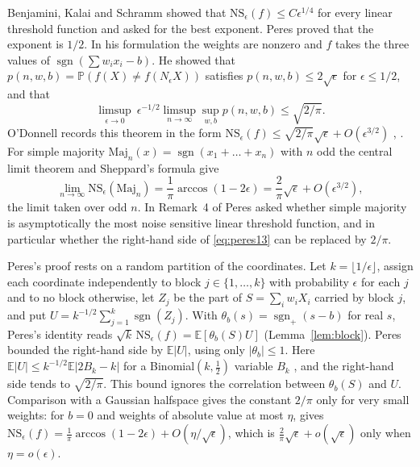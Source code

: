 \documentclass[11pt]{amsart}
\theoremstyle{remark}
\numberwithin{equation}{section}
\newcommand{\PP}{\mathbb{P}}
\newcommand{\EE}{\mathbb{E}}
\newcommand{\sgnp}{\operatorname{sgn}_+}
\newcommand{\sgnz}{\operatorname{sgn}}
\begin{document}
Benjamini, Kalai and Schramm \cite{BKS} showed that $\mathrm{NS}_\epsilon(f)\le C\epsilon^{1/4}$ for every linear threshold function and asked for the best exponent. Peres \cite{Per04} proved that the exponent is $1/2$. In his formulation the weights are nonzero and $f$ takes the three values of $\sgnz(\sum w_ix_i-b)$. He showed that $p(n,w,b)=\PP(f(X)\ne f(N_\epsilon X))$ satisfies $p(n,w,b)\le2\sqrt\epsilon$ for $\epsilon\le1/2$, and that
\begin{equation}\label{eq:peres13}
\limsup_{\epsilon\to0}\ \epsilon^{-1/2}\limsup_{n\to\infty}\sup_{w,b}p(n,w,b)\le\sqrt{2/\pi}.
\end{equation}
O'Donnell records this theorem in the form $\mathrm{NS}_\epsilon(f)\le\sqrt{2/\pi}\sqrt\epsilon+O(\epsilon^{3/2})$ \cite{OD12}, \cite[Remark~5.36]{OD14}.
For simple majority $\mathrm{Maj}_n(x)=\sgnz(x_1+\dots+x_n)$ with $n$ odd the central limit theorem and Sheppard's formula \cite{She99} give
\begin{equation}\label{eq:maj}
\lim_{n\to\infty}\mathrm{NS}_\epsilon(\mathrm{Maj}_n)=\frac1\pi\arccos(1-2\epsilon)=\frac2\pi\sqrt\epsilon+O(\epsilon^{3/2}),
\end{equation}
the limit taken over odd $n$. In Remark~4 of \cite{Per04} Peres asked whether simple majority is asymptotically the most noise sensitive linear threshold function, and in particular whether the right-hand side of \eqref{eq:peres13} can be replaced by $2/\pi$.

Peres's proof rests on a random partition of the coordinates. Let $k=\lfloor1/\epsilon\rfloor$, assign each coordinate independently to block $j\in\{1,\dots,k\}$ with probability $\epsilon$ for each $j$ and to no block otherwise, let $Z_j$ be the part of $S=\sum_iw_iX_i$ carried by block $j$, and put $U=k^{-1/2}\sum_{j=1}^k\sgnz(Z_j)$. With $\theta_b(s)=\sgnp(s-b)$ for real $s$, Peres's identity reads $\sqrt k\,\mathrm{NS}_\epsilon(f)=\EE[\theta_b(S)U]$ (Lemma~\ref{lem:block}). Peres bounded the right-hand side by $\EE|U|$, using only $|\theta_b|\le1$. Here $\EE|U|\le k^{-1/2}\EE|2B_k-k|$ for a Binomial$(k,\frac12)$ variable $B_k$ \cite[(2.6), (2.7)]{Per04}, and the right-hand side tends to $\sqrt{2/\pi}$. This bound ignores the correlation between $\theta_b(S)$ and $U$. Comparison with a Gaussian halfspace gives the constant $2/\pi$ only for very small weights: for $b=0$ and weights of absolute value at most $\eta$, \cite[Theorem~5.17]{OD14} gives $\mathrm{NS}_\epsilon(f)=\frac1\pi\arccos(1-2\epsilon)+O(\eta/\sqrt\epsilon)$, which is $\frac2\pi\sqrt\epsilon+o(\sqrt\epsilon)$ only when $\eta=o(\epsilon)$.
\end{document}
